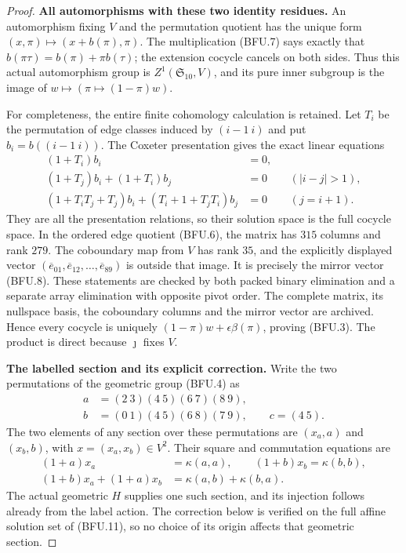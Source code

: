 \begin{proof}
\par\medskip\noindent\textbf{All automorphisms with these two identity residues.}\quad
An automorphism fixing $V$ and the permutation quotient has
the unique form $(x,\pi)\mapsto(x+b(\pi),\pi)$.
The multiplication (BFU.7) says exactly that
$b(\pi\tau)=b(\pi)+\pi b(\tau)$; the extension cocycle
cancels on both sides.  Thus this actual automorphism group
is $Z^1(\mathfrak S_{10},V)$, and its pure inner subgroup
is the image of $w\mapsto(\pi\mapsto(1-\pi)w)$.

For completeness, the entire finite cohomology calculation
is retained.  Let $T_i$ be the permutation of edge classes
induced by $(i-1\ i)$ and put $b_i=b((i-1\ i))$.
The Coxeter presentation gives the exact linear equations
\[
\begin{aligned}
 (1+T_i)b_i&=0,\\
 (1+T_j)b_i+(1+T_i)b_j&=0 &&(|i-j|>1),\\
 (1+T_iT_j+T_j)b_i+(T_i+1+T_jT_i)b_j&=0
                                                  &&(j=i+1).
\end{aligned}                                                   \tag{BFU.9}
\]
They are all the presentation relations, so their solution
space is the full cocycle space.  In the ordered edge
quotient (BFU.6), the matrix has $315$ columns and rank
$279$.  The coboundary map from $V$ has rank $35$, and
the explicitly displayed vector
$(\overline e_{01},\overline e_{12},\ldots,
  \overline e_{89})$ is outside that image.  It is precisely
the mirror vector (BFU.8).  These statements are checked
by both packed binary elimination and a separate array
elimination with opposite pivot order.  The complete
matrix, its nullspace basis, the coboundary columns and
the mirror vector are archived.  Hence every cocycle is
uniquely $(1-\pi)w+\epsilon\beta(\pi)$, proving (BFU.3).
The product is direct because $\jmath$ fixes $V$.

\par\medskip\noindent\textbf{The labelled section and its explicit correction.}\quad
Write the two permutations of the geometric group (BFU.4)
as
\[
\begin{aligned}
 a&=(2\ 3)(4\ 5)(6\ 7)(8\ 9),\\
 b&=(0\ 1)(4\ 5)(6\ 8)(7\ 9),\qquad c=(4\ 5).
\end{aligned}                                                   \tag{BFU.10}
\]
The two elements of any section over these permutations
are $(x_a,a)$ and $(x_b,b)$, with $x=(x_a,x_b)\in V^2$.
Their square and commutation equations are
\[
\begin{aligned}
 (1+a)x_a&=\kappa(a,a),\qquad
 (1+b)x_b=\kappa(b,b),\\
 (1+b)x_a+(1+a)x_b&=\kappa(a,b)+\kappa(b,a).
\end{aligned}                                                   \tag{BFU.11}
\]
The actual geometric $H$ supplies one such section, and
its injection follows already from the label action.
The correction below is verified on the full affine
solution set of (BFU.11), so no choice of its origin
affects that geometric section.


\end{proof}
